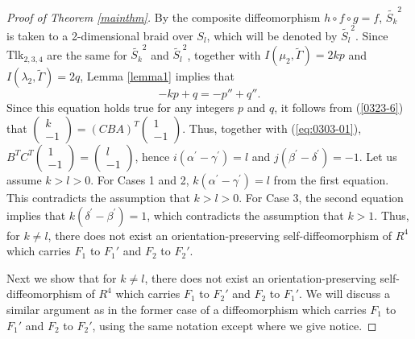 \documentclass[a4paper,11pt]{amsart}
\numberwithin{equation}{section}
\begin{document}
\begin{proof}[Proof of Theorem \ref{mainthm}]
\begin{sloppypar}
By the composite diffeomorphism $h \circ f \circ g=f$, $\widetilde{S_k}^2$ is taken to a 2-dimensional braid over $S_l$, which will be denoted by $\widetilde{S_l}^2$. 
Since $\mathrm{Tlk}_{2,3,4}$ are the same for $\widetilde{S_k}^2$ and $\widetilde{S_l}^2$, together with $I(\mu_2, \widetilde{\Gamma})=2kp$ and $I(\lambda_2, \widetilde{\Gamma})=2q$, Lemma \ref{lemma1} implies that  
\begin{equation}\label{0325-2}
-kp+q=-p''+q''. 
\end{equation}
Since this equation holds true for any integers $p$ and $q$, it follows from (\ref{0323-6}) that  
$\begin{pmatrix} k \\ -1 \end{pmatrix}=(CBA)^T \begin{pmatrix}1 \\ -1 \end{pmatrix}$. 
Thus, together with (\ref{eq:0303-01}), $B^T C^T\begin{pmatrix}1 \\ -1 \end{pmatrix}=\begin{pmatrix} l \\ -1 \end{pmatrix}$, hence  
$i(\alpha^\prime-\gamma^\prime)=l$ and $j (\beta^\prime-\delta^\prime)=-1$. 
Let us assume $k>l>0$. For Cases 1 and 2, $k(\alpha^\prime-\gamma^\prime)=l$ from the first equation. This contradicts the assumption that $k>l>0$. For Case 3, the second equation implies that $k(\delta^\prime-\beta^\prime)=1$, which contradicts the assumption that $k>1$. Thus, for $k\neq l$, there does not exist an orientation-preserving self-diffeomorphism of $R^4$ which carries $F_1$ to $F_1'$ and $F_2$ to $F_2'$. 

Next we show that for $k \neq l$, there does not exist an orientation-preserving self-diffeomorphism of $R^4$ which carries $F_1$ to $F_2'$ and $F_2$ to $F_1'$. We will discuss a similar argument as in the former case 
of a diffeomorphism which carries $F_1$ to $F_1'$ and $F_2$ to $F_2'$, using the same notation except where we give notice. 


\end{sloppypar}
\end{proof}
\end{document}
